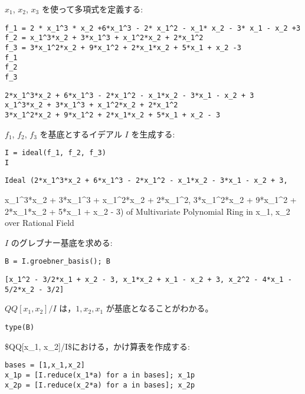 \documentclass[dvipdfmx,11pat]{jarticle}
\begin{document}
\(x_1\), \(x_2\), \(x_3\) を使って多項式を定義する:
\begin{verbatim}
f_1 = 2 * x_1^3 * x_2 +6*x_1^3 - 2* x_1^2 - x_1* x_2 - 3* x_1 - x_2 +3
f_2 = x_1^3*x_2 + 3*x_1^3 + x_1^2*x_2 + 2*x_1^2
f_3 = 3*x_1^2*x_2 + 9*x_1^2 + 2*x_1*x_2 + 5*x_1 + x_2 -3
f_1
f_2
f_3
\end{verbatim}

\label{org584c689}
\begin{verbatim}
2*x_1^3*x_2 + 6*x_1^3 - 2*x_1^2 - x_1*x_2 - 3*x_1 - x_2 + 3
x_1^3*x_2 + 3*x_1^3 + x_1^2*x_2 + 2*x_1^2
3*x_1^2*x_2 + 9*x_1^2 + 2*x_1*x_2 + 5*x_1 + x_2 - 3
\end{verbatim}




\(f_1\), \(f_2\), \(f_3\) を基底とするイデアル \(I\) を生成する:

\begin{verbatim}
I = ideal(f_1, f_2, f_3)
I
\end{verbatim}

\label{orgf5b1490}
\begin{verbatim}
Ideal (2*x_1^3*x_2 + 6*x_1^3 - 2*x_1^2 - x_1*x_2 - 3*x_1 - x_2 + 3,
\end{verbatim}

x\_1\^{}3*x\_2 + 3*x\_1\^{}3 + x\_1\^{}2*x\_2 + 2*x\_1\^{}2,
3*x\_1\^{}2*x\_2 + 9*x\_1\^{}2 + 2*x\_1*x\_2 + 5*x\_1 + x\_2 - 3)
of Multivariate Polynomial Ring in x\_1, x\_2 over Rational Field

\(I\)  のグレブナー基底を求める:

\begin{verbatim}
B = I.groebner_basis(); B
\end{verbatim}

\label{org4d5d68b}
\begin{verbatim}
[x_1^2 - 3/2*x_1 + x_2 - 3, x_1*x_2 + x_1 - x_2 + 3, x_2^2 - 4*x_1 - 5/2*x_2 - 3/2]
\end{verbatim}


\(QQ[x_1, x_2]/I\) は，\(1, x_2, x_1\) が基底となることがわかる。

\begin{verbatim}
type(B)
\end{verbatim}

\$QQ[x\_1, x\_2]/I\$における，かけ算表を作成する:

\begin{verbatim}
bases = [1,x_1,x_2]
x_1p = [I.reduce(x_1*a) for a in bases]; x_1p
x_2p = [I.reduce(x_2*a) for a in bases]; x_2p

\end{verbatim}
\end{document}
